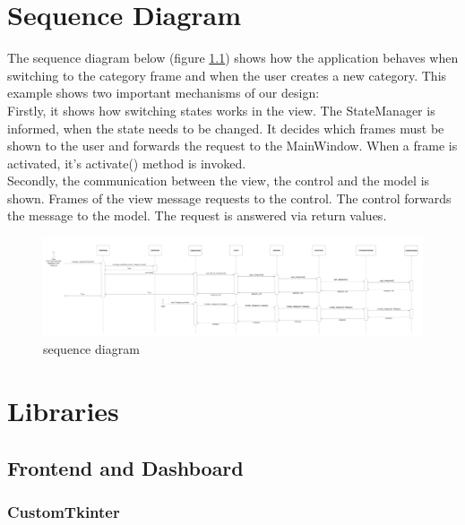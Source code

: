 \documentclass[letterpaper,10pt,english]{sphinxmanual}
\begin{document}
\chapter{Sequence Diagram}
\label{\detokenize{index:sequence-diagrams}}
\sphinxstepscope
The sequence diagram below (figure \ref{fig:sequencediagram}) shows how the application behaves when switching to the category frame and when the user creates a new category. This example shows two important mechanisms of our design:\\
Firstly, it shows how switching states works in the view. The StateManager is informed, when the state needs to be changed. It decides which frames must be shown to the user and forwards the request to the MainWindow. When a frame is activated, it's activate() method is invoked. \\
Secondly, the communication between the view, the control and the model is shown. Frames of the view message requests to the control. The control forwards the message to the model. The request is answered via return values.

\newpage

\begin{figure}
\centering
\includegraphics[width=1\textwidth]
        {pictures/sequenzdiagramm.png}
  \caption{sequence diagram}
  \label{fig:sequencediagram}
\end{figure}

\newpage


\chapter{Libraries}
\label{\detokenize{index:libaries}}
\sphinxstepscope

\section{Frontend and Dashboard}

\subsection{CustomTkinter}
\end{document}
